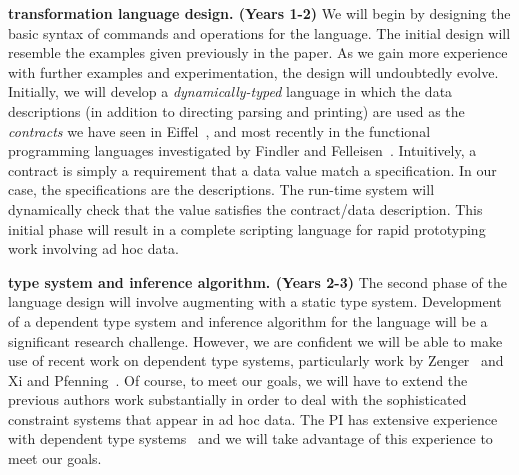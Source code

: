 \documentclass[11pt]{article}
\begin{document}




\noindent
{\bf \datatype{} transformation language design. (Years 1-2)}
We will begin by designing the basic syntax of commands and operations
for the language.  The initial design will resemble the examples
given previously in the paper.  As we gain more experience with further
examples and experimentation, the design will undoubtedly evolve.
Initially, we will develop a {\em dynamically-typed} language in which
the data descriptions (in addition to directing parsing and printing)
are used as the {\em contracts} we have seen in
Eiffel~\cite{eiffel}, and most recently in the functional
programming languages investigated by Findler and 
Felleisen~\cite{findler+:contracts}.  Intuitively, a contract
is simply a requirement that a data value match a specification.
In our case, the specifications are the \datatype{} descriptions.
The run-time system will dynamically 
check that the value satisfies the contract/data description.
This initial phase will result in a complete scripting language
for rapid prototyping work involving ad hoc data.  


\noindent
{\bf \datatype{} type system and inference algorithm. (Years 2-3)}
The second phase of the language design will involve augmenting 
\datatype with a static type system.  Development of a dependent
type system and inference algorithm for the language will be a
significant research challenge.  However, we are confident we will be
able to make use of recent work on dependent type systems,
particularly work by Zenger~\cite{zenger:indexed-types} and Xi and
Pfenning~\cite{xi+:dml}.  Of course, to meet our goals, we will have
to extend the previous authors work substantially in order to deal
with the sophisticated constraint systems that appear in ad hoc data.
The PI has extensive experience with dependent type
systems~\cite{walker:security,smith+:alias-types,walker+:capabilities,mandelbaum+:refinements,ahmed+:hierarchical,tan+:tcs04,}
and we will take advantage of this experience to meet our goals.
\end{document}
